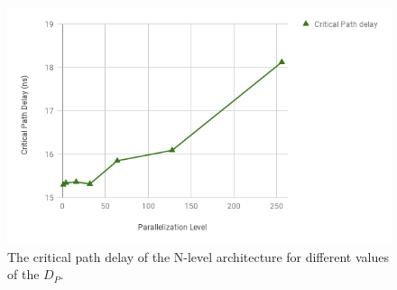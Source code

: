 \begin{figure}[t!]
\begin{center}
\includegraphics[clip,width=1\linewidth]{Fig/CriticalPathDelay_ParallelizationLevel.png}
\caption{The critical path delay of the N-level architecture for different values of the $D_P$. }
\label{fig:CriticalPath}
\end{center}
\end{figure}



